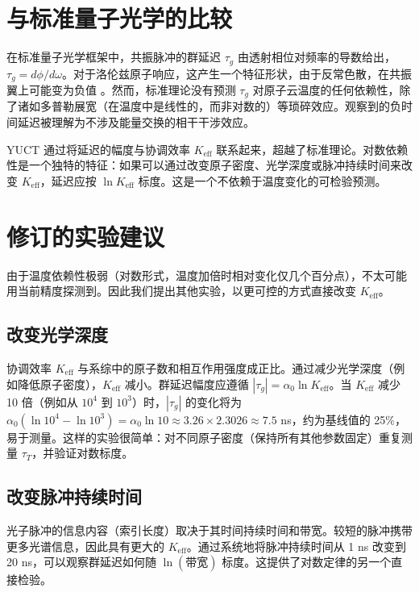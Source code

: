 \documentclass[12pt,a4paper]{article}
\newcommand{\Keff}{K_{\mathrm{eff}}}
\begin{document}
	\section{与标准量子光学的比较}
	
	在标准量子光学框架中，共振脉冲的群延迟 \(\tau_g\) 由透射相位对频率的导数给出，\(\tau_g = d\phi/d\omega\)。对于洛伦兹原子响应，这产生一个特征形状，由于反常色散，在共振翼上可能变为负值 \cite{Milonni2004}。然而，标准理论没有预测 \(\tau_g\) 对原子云温度的任何依赖性，除了诸如多普勒展宽（在温度中是线性的，而非对数的）等琐碎效应。观察到的负时间延迟被理解为不涉及能量交换的相干干涉效应。
	
	YUCT 通过将延迟的幅度与协调效率 \(\Keff\) 联系起来，超越了标准理论。对数依赖性是一个独特的特征：如果可以通过改变原子密度、光学深度或脉冲持续时间来改变 \(\Keff\)，延迟应按 \(\ln\Keff\) 标度。这是一个不依赖于温度变化的可检验预测。
	
	\section{修订的实验建议}
	
	由于温度依赖性极弱（对数形式，温度加倍时相对变化仅几个百分点），不太可能用当前精度探测到。因此我们提出其他实验，以更可控的方式直接改变 \(\Keff\)。
	
	\subsection{改变光学深度}
	
	协调效率 \(\Keff\) 与系综中的原子数和相互作用强度成正比。通过减少光学深度（例如降低原子密度），\(\Keff\) 减小。群延迟幅度应遵循 \(|\tau_g| = \alpha_0 \ln\Keff\)。当 \(\Keff\) 减少 10 倍（例如从 \(10^4\) 到 \(10^3\)）时，\(|\tau_g|\) 的变化将为 \(\alpha_0 (\ln 10^4 - \ln 10^3) = \alpha_0 \ln 10 \approx 3.26 \times 2.3026 \approx 7.5\) ns，约为基线值的 25\%，易于测量。这样的实验很简单：对不同原子密度（保持所有其他参数固定）重复测量 \(\tau_T\)，并验证对数标度。
	
	\subsection{改变脉冲持续时间}
	
	光子脉冲的信息内容（索引长度）取决于其时间持续时间和带宽。较短的脉冲携带更多光谱信息，因此具有更大的 \(\Keff\)。通过系统地将脉冲持续时间从 1 ns 改变到 20 ns，可以观察群延迟如何随 \(\ln(\text{带宽})\) 标度。这提供了对数定律的另一个直接检验。
	
\end{document}
